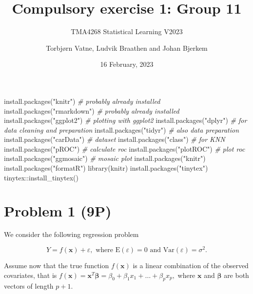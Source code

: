 \documentclass[
]{article}
\title{Compulsory exercise 1: Group 11}
\subtitle{TMA4268 Statistical Learning V2023}
\author{Torbjørn Vatne, Ludvik Braathen and Johan Bjerkem}
\date{16 February, 2023}
\newenvironment{Shaded}{\begin{snugshade}}{\end{snugshade}}
\newcommand{\CommentTok}[1]{\textcolor[rgb]{0.56,0.35,0.01}{\textit{#1}}}
\newcommand{\FunctionTok}[1]{\textcolor[rgb]{0.00,0.00,0.00}{#1}}
\newcommand{\NormalTok}[1]{#1}
\newcommand{\SpecialCharTok}[1]{\textcolor[rgb]{0.00,0.00,0.00}{#1}}
\newcommand{\StringTok}[1]{\textcolor[rgb]{0.31,0.60,0.02}{#1}}
\begin{document}
\maketitle

\begin{Shaded}
\begin{Highlighting}[]
\FunctionTok{install.packages}\NormalTok{(}\StringTok{"knitr"}\NormalTok{)     }\CommentTok{\# probably already installed}
\FunctionTok{install.packages}\NormalTok{(}\StringTok{"rmarkdown"}\NormalTok{) }\CommentTok{\# probably already installed}
\FunctionTok{install.packages}\NormalTok{(}\StringTok{"ggplot2"}\NormalTok{)   }\CommentTok{\# plotting with ggplot2}
\FunctionTok{install.packages}\NormalTok{(}\StringTok{"dplyr"}\NormalTok{)     }\CommentTok{\# for data cleaning and preparation}
\FunctionTok{install.packages}\NormalTok{(}\StringTok{"tidyr"}\NormalTok{)     }\CommentTok{\# also data preparation}
\FunctionTok{install.packages}\NormalTok{(}\StringTok{"carData"}\NormalTok{)   }\CommentTok{\# dataset}
\FunctionTok{install.packages}\NormalTok{(}\StringTok{"class"}\NormalTok{)     }\CommentTok{\# for KNN}
\FunctionTok{install.packages}\NormalTok{(}\StringTok{"pROC"}\NormalTok{)      }\CommentTok{\# calculate roc}
\FunctionTok{install.packages}\NormalTok{(}\StringTok{"plotROC"}\NormalTok{)   }\CommentTok{\# plot roc}
\FunctionTok{install.packages}\NormalTok{(}\StringTok{"ggmosaic"}\NormalTok{)  }\CommentTok{\# mosaic plot}
\FunctionTok{install.packages}\NormalTok{(}\StringTok{"knitr"}\NormalTok{)}
\FunctionTok{install.packages}\NormalTok{(}\StringTok{"formatR"}\NormalTok{)}
\FunctionTok{library}\NormalTok{(knitr)}
\FunctionTok{install.packages}\NormalTok{(}\StringTok{"tinytex"}\NormalTok{)}
\NormalTok{tinytex}\SpecialCharTok{::}\FunctionTok{install\_tinytex}\NormalTok{()}
\end{Highlighting}
\end{Shaded}

\hypertarget{problem-1-9p}{%
\section{Problem 1 (9P)}\label{problem-1-9p}}

We consider the following regression problem

\[
Y=f(\mathbf {x})+\varepsilon, \text{ where } \text{E}(\varepsilon)=0 \text{ and } \text{Var}(\varepsilon)=\sigma^2.
\]

Assume now that the true function \(f(\mathbf {x})\) is a linear
combination of the observed covariates, that is
\(f(\mathbf{x}) = \mathbf{x}^T\boldsymbol{\beta}=\beta_0 + \beta_1 x_1 + \ldots + \beta_p x_p,\)
where \(\mathbf{x}\) and \(\boldsymbol{\beta}\) are both vectors of
length \(p+1.\)
\end{document}
